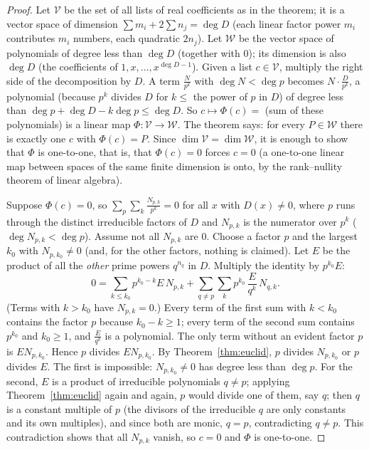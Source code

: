 \documentclass[11pt]{article}
\begin{document}
\begin{proof}
Let $\mathcal V$ be the set of all lists of real coefficients as in the theorem; it is a vector space of dimension $\sum m_i+2\sum n_j=\deg D$ (each linear factor power $m_i$ contributes $m_i$ numbers, each quadratic $2n_j$). Let $\mathcal W$ be the vector space of polynomials of degree less than $\deg D$ (together with $0$); its dimension is also $\deg D$ (the coefficients of $1,x,\dots,x^{\deg D-1}$). Given a list $c\in\mathcal V$, multiply the right side of the decomposition by $D$. A term $\frac{N}{p^k}$ with $\deg N<\deg p$ becomes $N\cdot\frac D{p^k}$, a polynomial (because $p^k$ divides $D$ for $k\le$ the power of $p$ in $D$) of degree less than $\deg p+\deg D-k\deg p\le\deg D$. So $c\mapsto\Phi(c)=$ (sum of these polynomials) is a linear map $\Phi:\mathcal V\to\mathcal W$. The theorem says: for every $P\in\mathcal W$ there is exactly one $c$ with $\Phi(c)=P$. Since $\dim\mathcal V=\dim\mathcal W$, it is enough to show that $\Phi$ is one-to-one, that is, that $\Phi(c)=0$ forces $c=0$ (a one-to-one linear map between spaces of the same finite dimension is onto, by the rank--nullity theorem of linear algebra).

Suppose $\Phi(c)=0$, so $\sum_p\sum_k\frac{N_{p,k}}{p^k}=0$ for all $x$ with $D(x)\ne0$, where $p$ runs through the distinct irreducible factors of $D$ and $N_{p,k}$ is the numerator over $p^k$ ($\deg N_{p,k}<\deg p$). Assume not all $N_{p,k}$ are $0$. Choose a factor $p$ and the largest $k_0$ with $N_{p,k_0}\ne0$ (and, for the other factors, nothing is claimed). Let $E$ be the product of all the \emph{other} prime powers $q^{n_q}$ in $D$. Multiply the identity by $p^{k_0}E$:
\[0=\sum_{k\le k_0}p^{k_0-k}E\,N_{p,k}+\sum_{q\ne p}\sum_k p^{k_0}\,\frac{E}{q^k}\,N_{q,k}.\]
(Terms with $k>k_0$ have $N_{p,k}=0$.) Every term of the first sum with $k<k_0$ contains the factor $p$ because $k_0-k\ge1$; every term of the second sum contains $p^{k_0}$ and $k_0\ge1$, and $\frac E{q^k}$ is a polynomial. The only term without an evident factor $p$ is $EN_{p,k_0}$. Hence $p$ divides $EN_{p,k_0}$. By Theorem~\ref{thm:euclid}, $p$ divides $N_{p,k_0}$ or $p$ divides $E$. The first is impossible: $N_{p,k_0}\ne0$ has degree less than $\deg p$. For the second, $E$ is a product of irreducible polynomials $q\ne p$; applying Theorem~\ref{thm:euclid} again and again, $p$ would divide one of them, say $q$; then $q$ is a constant multiple of $p$ (the divisors of the irreducible $q$ are only constants and its own multiples), and since both are monic, $q=p$, contradicting $q\ne p$. This contradiction shows that all $N_{p,k}$ vanish, so $c=0$ and $\Phi$ is one-to-one.
\end{proof}
\end{document}

